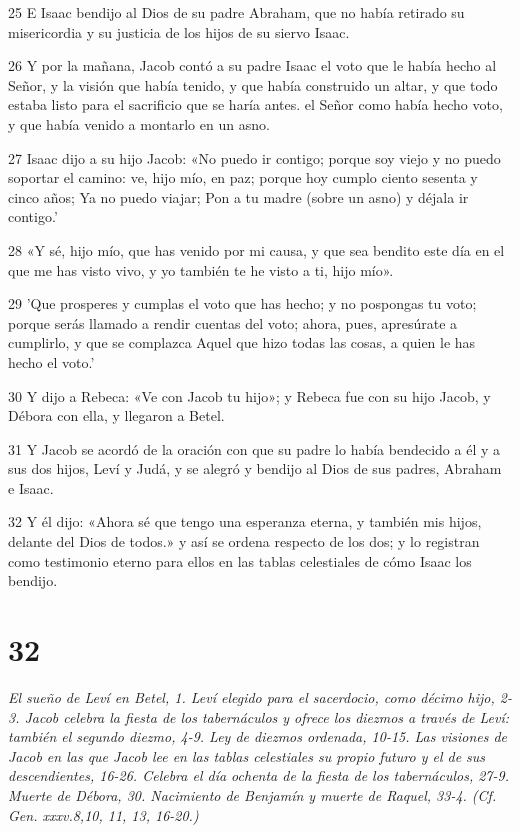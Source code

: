 \par 25 E Isaac bendijo al Dios de su padre Abraham, que no había retirado su misericordia y su justicia de los hijos de su siervo Isaac.
\par 26 Y por la mañana, Jacob contó a su padre Isaac el voto que le había hecho al Señor, y la visión que había tenido, y que había construido un altar, y que todo estaba listo para el sacrificio que se haría antes. el Señor como había hecho voto, y que había venido a montarlo en un asno.
\par 27 Isaac dijo a su hijo Jacob: «No puedo ir contigo; porque soy viejo y no puedo soportar el camino: ve, hijo mío, en paz; porque hoy cumplo ciento sesenta y cinco años; Ya no puedo viajar; Pon a tu madre (sobre un asno) y déjala ir contigo.'
\par 28 «Y sé, hijo mío, que has venido por mi causa, y que sea bendito este día en el que me has visto vivo, y yo también te he visto a ti, hijo mío».
\par 29 'Que prosperes y cumplas el voto que has hecho; y no pospongas tu voto; porque serás llamado a rendir cuentas del voto; ahora, pues, apresúrate a cumplirlo, y que se complazca Aquel que hizo todas las cosas, a quien le has hecho el voto.'
\par 30 Y dijo a Rebeca: «Ve con Jacob tu hijo»; y Rebeca fue con su hijo Jacob, y Débora con ella, y llegaron a Betel.
\par 31 Y Jacob se acordó de la oración con que su padre lo había bendecido a él y a sus dos hijos, Leví y Judá, y se alegró y bendijo al Dios de sus padres, Abraham e Isaac.
\par 32 Y él dijo: «Ahora sé que tengo una esperanza eterna, y también mis hijos, delante del Dios de todos.» y así se ordena respecto de los dos; y lo registran como testimonio eterno para ellos en las tablas celestiales de cómo Isaac los bendijo.

\chapter{32}

\par \textit{El sueño de Leví en Betel, 1. Leví elegido para el sacerdocio, como décimo hijo, 2-3. Jacob celebra la fiesta de los tabernáculos y ofrece los diezmos a través de Leví: también el segundo diezmo, 4-9. Ley de diezmos ordenada, 10-15. Las visiones de Jacob en las que Jacob lee en las tablas celestiales su propio futuro y el de sus descendientes, 16-26. Celebra el día ochenta de la fiesta de los tabernáculos, 27-9. Muerte de Débora, 30. Nacimiento de Benjamín y muerte de Raquel, 33-4. (Cf. Gen. xxxv.8,10, 11, 13, 16-20.)}

